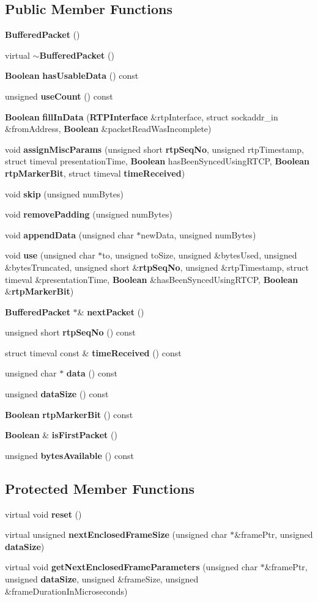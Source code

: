 \subsection*{Public Member Functions}
\begin{DoxyCompactItemize}
\item 
{\bf Buffered\+Packet} ()
\item 
virtual {\bf $\sim$\+Buffered\+Packet} ()
\item 
{\bf Boolean} {\bf has\+Usable\+Data} () const 
\item 
unsigned {\bf use\+Count} () const 
\item 
{\bf Boolean} {\bf fill\+In\+Data} ({\bf R\+T\+P\+Interface} \&rtp\+Interface, struct sockaddr\+\_\+in \&from\+Address, {\bf Boolean} \&packet\+Read\+Was\+Incomplete)
\item 
void {\bf assign\+Misc\+Params} (unsigned short {\bf rtp\+Seq\+No}, unsigned rtp\+Timestamp, struct timeval presentation\+Time, {\bf Boolean} has\+Been\+Synced\+Using\+R\+T\+C\+P, {\bf Boolean} {\bf rtp\+Marker\+Bit}, struct timeval {\bf time\+Received})
\item 
void {\bf skip} (unsigned num\+Bytes)
\item 
void {\bf remove\+Padding} (unsigned num\+Bytes)
\item 
void {\bf append\+Data} (unsigned char $\ast$new\+Data, unsigned num\+Bytes)
\item 
void {\bf use} (unsigned char $\ast$to, unsigned to\+Size, unsigned \&bytes\+Used, unsigned \&bytes\+Truncated, unsigned short \&{\bf rtp\+Seq\+No}, unsigned \&rtp\+Timestamp, struct timeval \&presentation\+Time, {\bf Boolean} \&has\+Been\+Synced\+Using\+R\+T\+C\+P, {\bf Boolean} \&{\bf rtp\+Marker\+Bit})
\item 
{\bf Buffered\+Packet} $\ast$\& {\bf next\+Packet} ()
\item 
unsigned short {\bf rtp\+Seq\+No} () const 
\item 
struct timeval const \& {\bf time\+Received} () const 
\item 
unsigned char $\ast$ {\bf data} () const 
\item 
unsigned {\bf data\+Size} () const 
\item 
{\bf Boolean} {\bf rtp\+Marker\+Bit} () const 
\item 
{\bf Boolean} \& {\bf is\+First\+Packet} ()
\item 
unsigned {\bf bytes\+Available} () const 
\end{DoxyCompactItemize}
\subsection*{Protected Member Functions}
\begin{DoxyCompactItemize}
\item 
virtual void {\bf reset} ()
\item 
virtual unsigned {\bf next\+Enclosed\+Frame\+Size} (unsigned char $\ast$\&frame\+Ptr, unsigned {\bf data\+Size})
\item 
virtual void {\bf get\+Next\+Enclosed\+Frame\+Parameters} (unsigned char $\ast$\&frame\+Ptr, unsigned {\bf data\+Size}, unsigned \&frame\+Size, unsigned \&frame\+Duration\+In\+Microseconds)
\end{DoxyCompactItemize}
